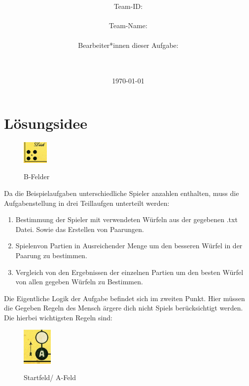 \documentclass[a4paper,11pt,ngerman]{scrartcl}
\title{\textbf{\Huge\Aufgabe}}
\author{\LARGE Team-ID: \LARGE \TeamId \\\\
	    \LARGE Team-Name: \LARGE \TeamName \\\\
	    \LARGE Bearbeiter*innen dieser Aufgabe: \\ 
	    \LARGE \Namen\\\\}
\date{\LARGE\today}
\begin{document}
\maketitle
\tableofcontents

\vspace{0.5cm}


\section{Lösungsidee}

 \begin{figure} 
 	\centering
 	\includegraphics[width=0.11\textwidth]{home}	 	
 	\caption{}
 	\small{B-Felder}
 	\label{fig:B-Felder}
 \end{figure}
Da die Beispielaufgaben unterschiedliche Spieler anzahlen enthalten, muss die Aufgabenstellung in drei
Teillaufgen unterteilt werden:

\begin{enumerate}
	
	\item Bestimmung der Spieler mit verwendeten Würfeln aus der gegebenen .txt Datei. Sowie das Erstellen von Paarungen.
	\item \glqq Spielen\grqq\space von Partien in Ausreichender Menge um den besseren Würfel in der Paarung zu bestimmen.
	\item Vergleich von den Ergebnissen der einzelnen Partien um den besten Würfel von allen gegeben Würfeln zu Bestimmen.	
\end{enumerate}
Die Eigentliche Logik der Aufgabe befindet sich im zweiten Punkt. Hier müssen die Gegeben Regeln des Mensch ärgere dich nicht Spiels berücksichtigt werden. Die hierbei wichtigsten Regeln sind:\\
\begin{figure} 
	\centering
	\includegraphics[width=0.13\textwidth]{start}	
	\caption{}
	{\small Startfeld/ A-Feld}
	\label{fig:Startfeld}
\end{figure}
\end{document}
